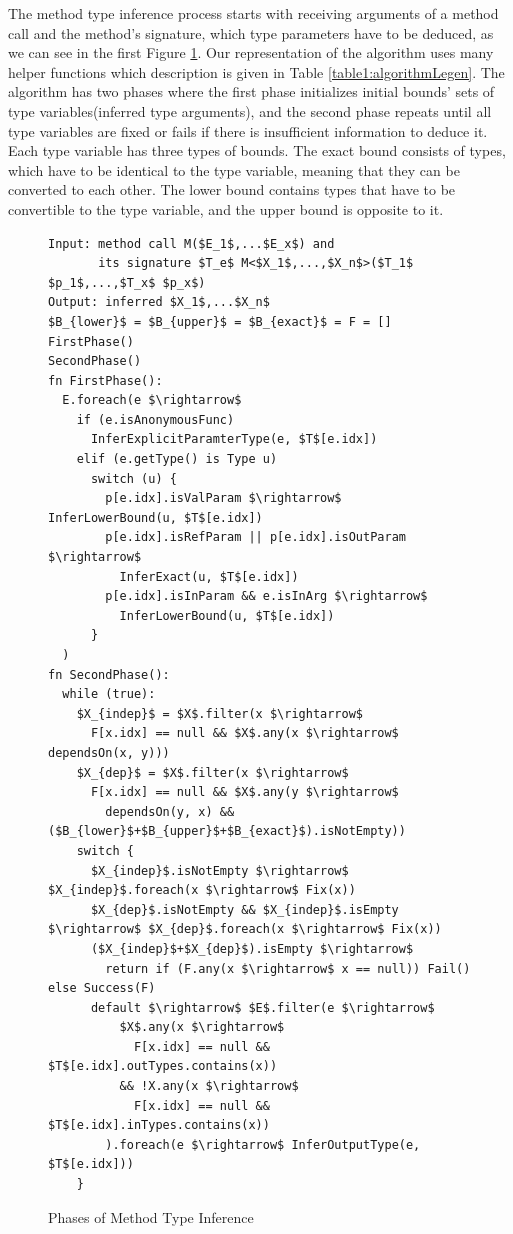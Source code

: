 \par
The method type inference process starts with receiving arguments of a method call and the method's signature, which type parameters have to be deduced, as we can see in the first Figure \ref{img70:methodTypeInference1}.
Our representation of the algorithm uses many helper functions which description is given in Table \ref{table1:algorithmLegen}.
The algorithm has two phases where the first phase initializes initial bounds' sets of type variables(inferred type arguments), and the second phase repeats until all type variables are fixed or fails if there is insufficient information to deduce it.
Each type variable has three types of bounds. 
The exact bound consists of types, which have to be identical to the type variable, meaning that they can be converted to each other.
The lower bound contains types that have to be convertible to the type variable, and the upper bound is opposite to it.
\par
\begin{figure}[h!]
\begin{lstlisting}[style=myAlgo, mathescape=true]
Input: method call M($E_1$,...$E_x$) and 
       its signature $T_e$ M<$X_1$,...,$X_n$>($T_1$ $p_1$,...,$T_x$ $p_x$)
Output: inferred $X_1$,...$X_n$
$B_{lower}$ = $B_{upper}$ = $B_{exact}$ = F = []
FirstPhase()
SecondPhase()
fn FirstPhase():
  E.foreach(e $\rightarrow$  
    if (e.isAnonymousFunc)
      InferExplicitParamterType(e, $T$[e.idx])
    elif (e.getType() is Type u)
      switch (u) {
        p[e.idx].isValParam $\rightarrow$ InferLowerBound(u, $T$[e.idx])
        p[e.idx].isRefParam || p[e.idx].isOutParam $\rightarrow$ 
          InferExact(u, $T$[e.idx])
        p[e.idx].isInParam && e.isInArg $\rightarrow$ 
          InferLowerBound(u, $T$[e.idx])
      }
  )
fn SecondPhase():
  while (true):
    $X_{indep}$ = $X$.filter(x $\rightarrow$ 
      F[x.idx] == null && $X$.any(x $\rightarrow$ dependsOn(x, y)))
    $X_{dep}$ = $X$.filter(x $\rightarrow$
      F[x.idx] == null && $X$.any(y $\rightarrow$ 
        dependsOn(y, x) && ($B_{lower}$+$B_{upper}$+$B_{exact}$).isNotEmpty))
    switch {
	  $X_{indep}$.isNotEmpty $\rightarrow$ $X_{indep}$.foreach(x $\rightarrow$ Fix(x))     
	  $X_{dep}$.isNotEmpty && $X_{indep}$.isEmpty $\rightarrow$ $X_{dep}$.foreach(x $\rightarrow$ Fix(x))
	  ($X_{indep}$+$X_{dep}$).isEmpty $\rightarrow$ 
	    return if (F.any(x $\rightarrow$ x == null)) Fail() else Success(F)
	  default $\rightarrow$ $E$.filter(e $\rightarrow$ 
	      $X$.any(x $\rightarrow$ 
	        F[x.idx] == null && $T$[e.idx].outTypes.contains(x)) 
	      && !X.any(x $\rightarrow$ 
	        F[x.idx] == null && $T$[e.idx].inTypes.contains(x))
	    ).foreach(e $\rightarrow$ InferOutputType(e, $T$[e.idx]))
    }
\end{lstlisting}
\caption{Phases of Method Type Inference}
\label{img70:methodTypeInference1}
\end{figure}
